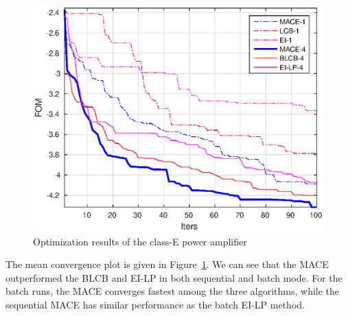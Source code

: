 \begin{figure}[]
    \begin{center}
        \centerline{\includegraphics[width=\columnwidth]{./img/ClassE_mean.eps}}
        \caption{Optimization results of the class-E power amplifier}
        \label{fig:resClassE}
    \end{center}
    \vskip -0.2in
\end{figure}

The mean convergence plot is given in Figure~\ref{fig:resClassE}. We can see
that the MACE outperformed the BLCB and EI-LP in both sequential and batch
mode. For the batch runs, the MACE converges fastest among the three
algorithms, while the sequential MACE has similar performance as the batch
EI-LP method.


